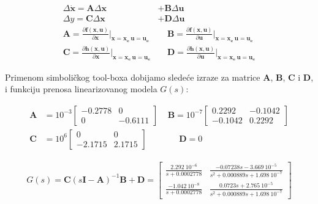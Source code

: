 \documentclass[a4paper,11pt]{article}
\theoremstyle{definition} \newtheorem{deff}{Definicija}[section]
\theoremstyle{definition} \newtheorem{prim}[deff]{Primer}
\theoremstyle{plain} \newtheorem{teor}[deff]{Teorema}
\begin{document}
	\begin{equation}
		\begin{split}
			\Delta \dot{\textbf{x}} = \textbf{A}\Delta \textbf{x} &+ \textbf{B}\Delta \mathbf{u} \\
			\Delta y = \textbf{C}\Delta \textbf{x} &+ \textbf{D}\Delta \mathbf{u} \\
			\textbf{A} =\frac{\partial  \textbf{f}(\textbf{x},\mathbf{u})}{\partial \textbf{x}}|_{\textbf{x}=\mathbf{x_e} ~ \mathbf{u}=\mathbf{u_e}}& ~~~~~ \textbf{B} =\frac{\partial  \textbf{f}(\textbf{x},\mathbf{u})}{\partial \mathbf{u}}|_{\textbf{x}=\mathbf{x_e} ~ \mathbf{u}=\mathbf{u_e}} \\
			\textbf{C} =\frac{\partial  \mathbf{h}(\textbf{x},\mathbf{u})}{\partial \textbf{x}}|_{\textbf{x}=\mathbf{x_e} ~ \mathbf{u}=\mathbf{u_e}}&  ~~~~~ \textbf{D} = \frac{\partial  \mathbf{h}(\textbf{x},\mathbf{u})}{\partial \mathbf{u}}|_{\textbf{x}=\mathbf{x_e} ~ \mathbf{u}=\mathbf{u_e}}
		\end{split}
	\end{equation}
	
	Primenom simboličkog tool-boxa dobijamo sledeće izraze za matrice \textbf{A}, \textbf{B}, \textbf{C} i \textbf{D}, i funkciju prenosa linearizovanog modela $G(s)$: 
	
	
	
	
	\begin{equation}
		\begin{split}
			\textbf{A} &= 10^{-3}\begin{bmatrix}
				-0.2778 & 0 \\
				0 & -0.6111
			\end{bmatrix} 			
			~~~~~ \textbf{B} =10^{-7}\begin{bmatrix}
				0.2292 &  -0.1042\\
				-0.1042 &   0.2292
			\end{bmatrix}  \\						
			\textbf{C} &= 10^{6}\begin{bmatrix} 
				0 & 0\\
				-2.1715 &   2.1715
			\end{bmatrix}   ~~~~~~~~~~~~~~~~~ \textbf{D} = 0
		\end{split}
	\end{equation}
	
	\begin{equation}
		\begin{split}
			G(s) = \textbf{C}(s\textbf{I}-\textbf{A})^{-1}\textbf{B} + \textbf{D} = 
			\begin{bmatrix}
				\frac{2.292~10^{-6}}{s+ 0.0002778} &  \frac{-0.07238s - 3.669~10^{-5}}{s^2 + 0.000889s + 1.698~10^{-7}} \\
				\frac{-1.042~10^{-8}}{s + 0.0002778} & \frac{0.0723s + 2.765~10^{-5}}{s^2 + 0.000889s + 1.698~10^{-7} }
			\end{bmatrix}
			\\
		\end{split}
	\end{equation}
	
\end{document}

